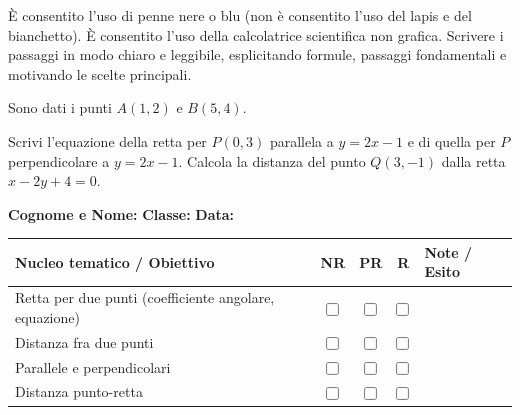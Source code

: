 \documentclass[a4paper,10pt]{exam}
\newcommand{\cbox}{\ensuremath{\vcenter{\hbox{\tikz{\draw[black!75, line width=0.5pt, rounded corners=1.2pt] (0,0) rectangle (3.0mm, 3.0mm);}}}}}
\newcommand{\linearecupero}[1]{#1 & \cbox & \cbox & \cbox & \\}
\newcommand{\grigliarecupero}[1]{
\vspace{1mm}
\noindent
\begin{center}
\footnotesize
\renewcommand{\arraystretch}{1.2}
\begin{tabular}{p{0.54\textwidth} ccc p{0.24\textwidth}}
\toprule
\rowcolor{gray!12}
\textbf{Nucleo tematico / Obiettivo} & \textbf{NR} & \textbf{PR} & \textbf{R} & \textbf{Note / Esito} \\
\midrule
#1
\bottomrule
\end{tabular}
\end{center}
}
\begin{document}
\begin{tcolorbox}[istruzionibox]
È consentito l'uso di penne nere o blu (non è consentito l'uso del lapis e del bianchetto).
È consentito l'uso della calcolatrice scientifica non grafica.
Scrivere i passaggi in modo chiaro e leggibile, esplicitando formule, passaggi fondamentali e motivando le scelte principali.
\end{tcolorbox}

\vspace{1.5mm}


\begin{questions}
\question Sono dati i punti $A(1,2)$ e $B(5,4)$.
\question Scrivi l'equazione della retta per $P(0,3)$ parallela a $y=2x-1$ e di quella per $P$ perpendicolare a $y=2x-1$.
\question Calcola la distanza del punto $Q(3,-1)$ dalla retta $x-2y+4=0$.
\end{questions}

\null
\vfill

\noindent
\textbf{Cognome e Nome:}\enspace\hrulefill\hspace{1cm}%
\textbf{Classe:}\enspace\makebox[2.5cm]{\hrulefill}\hspace{1cm}%
\textbf{Data:}\enspace\makebox[2.5cm]{\hrulefill}

\vspace{3mm}
\grigliarecupero{
\linearecupero{Retta per due punti (coefficiente angolare, equazione)}
\linearecupero{Distanza fra due punti}
\linearecupero{Parallele e perpendicolari}
\linearecupero{Distanza punto-retta}
}
\end{document}
